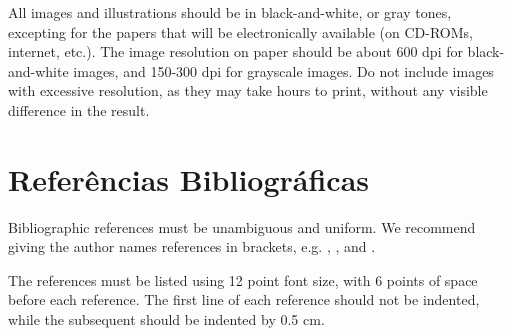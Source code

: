 \documentclass[12pt]{article}
\begin{document}
All images and illustrations should be in black-and-white, or gray tones,
excepting for the papers that will be electronically available (on CD-ROMs,
internet, etc.). The image resolution on paper should be about 600 dpi for
black-and-white images, and 150-300 dpi for grayscale images.  Do not include
images with excessive resolution, as they may take hours to print, without any
visible difference in the result. 

\section{Referências Bibliográficas}

Bibliographic references must be unambiguous and uniform.  We recommend giving
the author names references in brackets, e.g. \cite{knuth:84},
\cite{boulic:91}, and \cite{smith:99}.

The references must be listed using 12 point font size, with 6 points of space
before each reference. The first line of each reference should not be
indented, while the subsequent should be indented by 0.5 cm.




\end{document}

